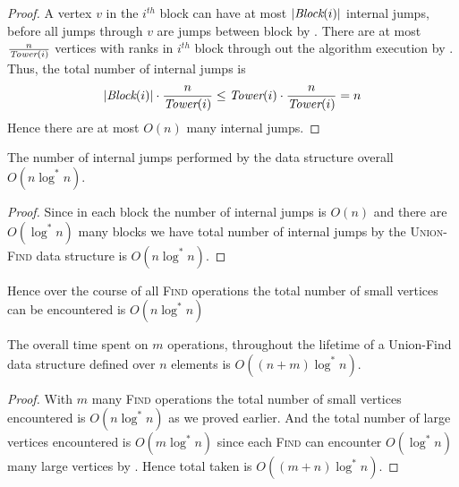 \begin{proof}
A vertex $v$ in the $i^{th}$ block can have at most $|\emph{Block}(i)|$ internal jumps, before all jumps through $v$ are jumps between block by . There are at most $\frac{n}{\emph{Tower}(i)}$ vertices with ranks in $i^{th}$ block through out the algorithm execution by . Thus, the total number of internal jumps is $$|\emph{Block}(i)|\cdot\frac{n}{\emph{Tower}(i)}\leq \emph{Tower}(i)\cdot \frac{n}{\emph{Tower}(i)}=n$$Hence there are at most $O(n)$ many internal jumps.
\end{proof}

\begin{Theorem}{}{}
	The number of internal jumps performed by the  data structure overall $O(n\log^*n)$.
\end{Theorem}
\begin{proof}
Since in each block the number of internal jumps is $O(n)$ and there are $O(\log^*n)$ many blocks we have total number of internal jumps by the \textsc{Union-Find} data structure is $O(n\log^*n)$. 
\end{proof}
Hence over the course of all \textsc{Find} operations the total number of small vertices can be encountered is $O(n\log^*n)$
\begin{Theorem}{}{}
	The overall time spent on $m$  operations, throughout the lifetime of a Union-Find data structure defined over $n$ elements is $O((n+m)\log^*n)$.
\end{Theorem}
\begin{proof}
With $m$ many \textsc{Find} operations the total number of small vertices encountered is $O(n\log^*n)$ as we proved earlier. And the total number of large vertices encountered is $O(m\log ^*n)$ since each \textsc{Find} can encounter $O(\log^*n)$ many large vertices by . Hence total taken is $O((m+n)\log^*n)$.
\end{proof}